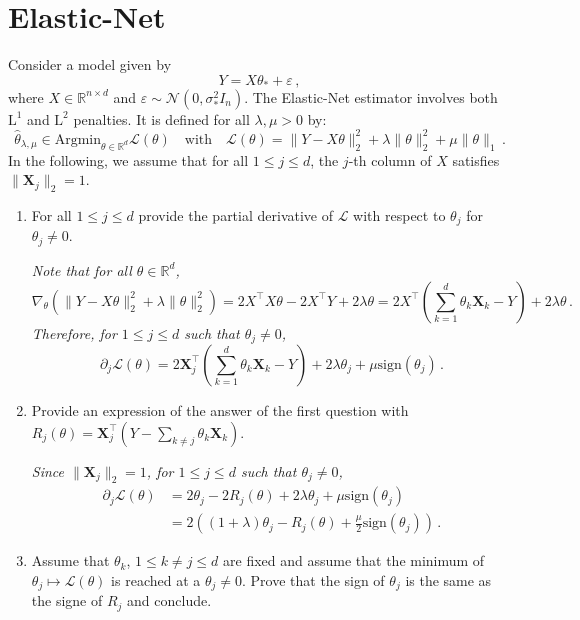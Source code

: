 \documentclass[a4paper,10pt,fleqn]{article}
\newcommand{\eqsp}{\,}
\newcommand{\rset}{\ensuremath{\mathbb{R}}}
\newcommand{\1}{\ensuremath{\mathbbm{1}}}
\begin{document}
\section{Elastic-Net}
Consider a model given by 
$$
Y = X\theta_* + \varepsilon\,,
$$
where $X\in\mathbb{R}^{n\times d}$ and $\varepsilon \sim \mathcal{N}(0,\sigma_*^2I_n)$. The Elastic-Net estimator involves both $\mathrm{L}^1$ and $\mathrm{L}^2$ penalties. It is defined for all $\lambda,\mu>0$ by:
$$
\widehat{\theta}_{\lambda,\mu}\in\mathrm{Argmin}_{\theta\in\mathbb{R}^d} \mathcal{L}(\theta)\quad\mathrm{with} \quad \mathcal{L}(\theta) = \|Y-X\theta\|_2^2 + \lambda \|\theta\|_2^2 + \mu \|\theta\|_1\,.
 $$
In the following, we assume that for all $1\leq j\leq d$, the $j$-th column of $X$ satisfies $\|\mathbf{X}_j\|_2 = 1$.
\begin{enumerate}
\item For all $1\leq j \leq d$ provide the partial derivative of $\mathcal{L}$ with respect to $\theta_j$ for $\theta_j\neq 0$. 

\vspace{.2cm}

{\em
Note that for all $\theta\in\rset^d$,
$$
\nabla_\theta(\|Y-X\theta\|_2^2 + \lambda \|\theta\|_2^2) = 2X^\top X\theta - 2 X^\top Y+ 2\lambda \theta = 2X^\top \left(\sum_{k=1}^d \theta_k\mathbf{X}_k - Y\right)  + 2\lambda \theta\eqsp.
$$
Therefore, for $1\leq j \leq d$ such that $\theta_j\neq 0$,
$$
\partial_j  \mathcal{L}(\theta) = 2\mathbf{X}^\top_j \left(\sum_{k=1}^d \theta_k\mathbf{X}_k -Y\right)+ 2\lambda \theta_j + \mu \mathrm{sign}(\theta_j) \eqsp.
$$
}
\item Provide an expression of the answer of the first question with $R_j(\theta) = \mathbf{X}_j^\top(Y - \sum_{k\neq j}\theta_k\mathbf{X}_k)$.

\vspace{.2cm}

{\em
Since $\|\mathbf{X}_j\|_2 = 1$, for $1\leq j \leq d$ such that $\theta_j\neq 0$,
\begin{align*}
\partial_j  \mathcal{L}(\theta) &= 2\theta_j -2R_j(\theta)+ 2\lambda \theta_j + \mu \mathrm{sign}(\theta_j)\\
&= 2\left((1+\lambda)\theta_j -R_j(\theta) + \frac{\mu}{2} \mathrm{sign}(\theta_j)\right)\eqsp.
\end{align*}
}
\item Assume that $\theta_k$, $1\leq k\neq j \leq d$ are fixed and assume that the minimum of $\theta_j \mapsto \mathcal{L}(\theta)$ is reached at a $\theta_j\neq 0$. Prove that the sign of $\theta_j$ is the same as the signe of $R_j$ and conclude.


\end{enumerate}
\end{document}
